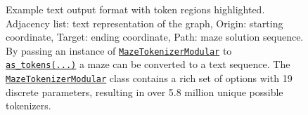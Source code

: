 \begin{figure} 
	\centering
	\hspace{-1em}
	\begin{minipage}{5in}
		\footnotesize
		
	\end{minipage}
	\caption{
		Example text output format with token regions highlighted.
		\colorbox[RGB]{ 217,210,233 }{Adjacency list}: text representation of the graph,
		\colorbox[RGB]{ 217,234,211 }{Origin}: starting coordinate,
		\colorbox[RGB]{ 234,209,220 }{Target}: ending coordinate,
		\colorbox[RGB]{ 207,226,243 }{Path}: maze solution sequence.
		By passing an instance of
		\href{https://understanding-search.github.io/maze-dataset/maze_dataset/tokenization.html\#MazeTokenizerModular}{\texttt{MazeTokenizerModular}}
		to
		\href{https://understanding-search.github.io/maze-dataset/maze_dataset.html\#MazeDataset.as_tokens}{\texttt{as\_tokens(...)}}
		a maze can be converted to a text sequence. The
		\href{https://understanding-search.github.io/maze-dataset/maze_dataset/tokenization.html\#MazeTokenizerModular}{\texttt{MazeTokenizerModular}}
		class contains a rich set of options with 19 discrete parameters, resulting in over 5.8 million unique possible tokenizers.
	}
	\label{fig:token-regions}
\end{figure}